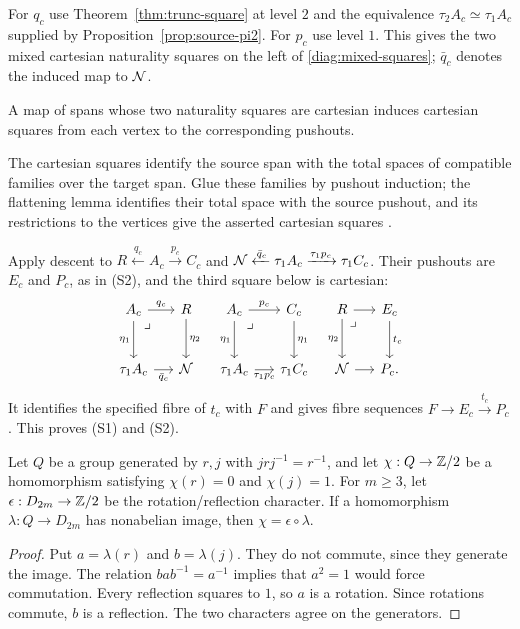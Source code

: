 For $q_c$ use Theorem~\ref{thm:trunc-square} at level $2$ and the equivalence $\tau_2A_c\simeq\tau_1A_c$ supplied by Proposition~\ref{prop:source-pi2}. For $p_c$ use level $1$. This gives the two mixed cartesian naturality squares on the left of \eqref{diag:mixed-squares}; $\bar q_c$ denotes the induced map to $\mathcal N$.

\begin{proposition}\label{prop:pushout-descent}
A map of spans whose two naturality squares are cartesian induces cartesian squares from each vertex to the corresponding pushouts.
\end{proposition}
The cartesian squares identify the source span with the total spaces of compatible families over the target span. Glue these families by pushout induction; the flattening lemma identifies their total space with the source pushout, and its restrictions to the vertices give the asserted cartesian squares \cite[\S6.12]{hott}.

Apply descent to $R\xleftarrow{q_c}A_c\xrightarrow{p_c}C_c$ and $\mathcal N\xleftarrow{\bar q_c}\tau_1A_c\xrightarrow{\tau_1p_c}\tau_1C_c$. Their pushouts are $E_c$ and $P_c$, as in (S2), and the third square below is cartesian:
\begin{equation}\label{diag:mixed-squares}
\begin{tikzcd}[column sep=1.4em,row sep=large]
A_c \arrow[r,"q_c"] \arrow[d,"\eta_1"'] \pbmark & R \arrow[d,"\eta_2"]
&[-.3em] A_c \arrow[r,"p_c"] \arrow[d,"\eta_1"'] \pbmark & C_c \arrow[d,"\eta_1"]
&[-.3em] R \arrow[r] \arrow[d,"\eta_2"'] \pbmark & E_c \arrow[d,"t_c"] \\
\tau_1A_c \arrow[r,"\bar q_c"'] & \baseN
& \tau_1A_c \arrow[r,"\tau_1p_c"'] & \tau_1C_c
& \baseN \arrow[r] & P_c.
\end{tikzcd}
\end{equation}
It identifies the specified fibre of $t_c$ with $F$ and gives fibre sequences $F\to E_c\xrightarrow{t_c}P_c$. This proves (S1) and (S2).

\begin{lemma}\label{lem:dihedral-character}
Let $Q$ be a group generated by $r,j$ with $jrj^{-1}=r^{-1}$, and let $\chi:Q\to\mathbb Z/2$ be a homomorphism satisfying $\chi(r)=0$ and $\chi(j)=1$. For $m\geq3$, let $\epsilon:D_{2m}\to\mathbb Z/2$ be the rotation/reflection character. If a homomorphism $\lambda:Q\to D_{2m}$ has nonabelian image, then $\chi=\epsilon\circ\lambda$.
\end{lemma}
\begin{proof}
Put $a=\lambda(r)$ and $b=\lambda(j)$. They do not commute, since they generate the image. The relation $bab^{-1}=a^{-1}$ implies that $a^2=1$ would force commutation. Every reflection squares to $1$, so $a$ is a rotation. Since rotations commute, $b$ is a reflection. The two characters agree on the generators.
\end{proof}

